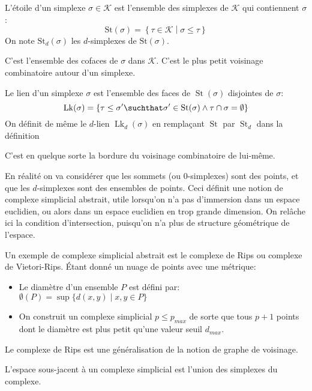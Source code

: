 \documentclass[info, math]{mpb-cours}
\DeclareMathOperator{\St}{St}
\DeclareMathOperator{\Lk}{Lk}
\def\mK{\mathcal{K}}
\begin{document}
\begin{definition}
	L'étoile d'un simplexe $\sigma \in \mathcal{K}$ est l'ensemble des simplexes de $\mathcal{K}$ qui contiennent $\sigma$:
	\begin{equation*}
		\mathrm{St}(\sigma) = \left\{\tau \in \mathcal{K} \middle| \sigma \leq \tau \right\}
	\end{equation*}
	On note $\mathrm{St}_{d}(\sigma)$ les $d$-simplexes de $\mathrm{St}(\sigma)$.
\end{definition}
C'est l'ensemble des cofaces de $\sigma$ dans $\mK$. C'est le plus petit voisinage combinatoire autour d'un simplexe.

\begin{definition}
	Le lien d'un simplexe $\sigma$ est l'ensemble des faces de $\St(\sigma)$ disjointes de $\sigma$:
	\begin{equation*}
		\Lk(\sigma) = \left\{\tau \leq \sigma' \suchthat \sigma' \in \St(\sigma) \land \tau \cap \sigma = \emptyset \right\}
	\end{equation*}
	On définit de même le $d$-lien $\Lk_{d}(\sigma)$ en remplaçant $\St$ par $\St_{d}$ dans la définition
\end{definition}
C'est en quelque sorte la bordure du voisinage combinatoire de lui-même.

\medskip

En réalité on va considérer que les sommets (ou $0$-simplexes) sont des points, et que les $d$-simplexes sont des ensembles de points.
Ceci définit une notion de complexe simplicial abstrait, utile lorsqu'on n'a pas d'immersion dans un espace euclidien, ou alors dans un espace euclidien en trop grande dimension.
On relâche ici la condition d'intersection, puisqu'on n'a plus de structure géométrique de l'espace.

Un exemple de complexe simplicial abstrait est le complexe de Rips ou complexe de Vietori-Rips. Étant donné un nuage de points avec une métrique:
\begin{itemize}
	\item Le diamètre d'un ensemble $P$ est défini par: $\emptyset(P) = \sup\{d(x, y) \mid x, y \in P\}$
	\item On construit un complexe simplicial $p \leq p_{max}$ de sorte que tous $p + 1$ points dont le diamètre est plus petit qu'une valeur seuil $d_{max}$.
\end{itemize}
Le complexe de Rips est une généralisation de la notion de graphe de voisinage.

\begin{definition}
	L'espace sous-jacent à un complexe simplicial est l'union des simplexes du complexe.
\end{definition}
\end{document}
